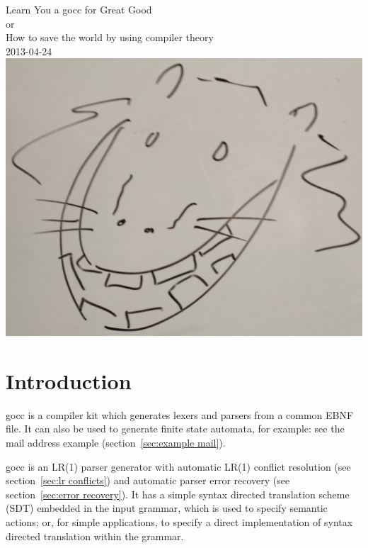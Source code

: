 \documentclass[12pt]{article}
\begin{document}
\begin{center}
	{\Huge Learn You a gocc for Great Good} \\
	{\large or \\
	How to save the world by using compiler theory \\
	\vspace{1cm}
	2013-04-24}\\
	\vspace{1cm}
	\includegraphics[scale=.1]{gocc}
\end{center}
\tableofcontents

\newcommand{\TBD}{\textcolor{red}{TBD}}
\newcommand{\TBDx}[1]{\textcolor{red}{TBD:} #1}
\newcommand{\Go}{{\em Go}\ }
\newcommand{\Code}[1]{{\bf #1} } 
\newcommand{\gocc}{{\em gocc}\ }
\newcommand{\Clang}{{\em C} language}

\section{Introduction}
	gocc is a compiler kit which generates lexers and parsers from a common EBNF file. It can also be used to generate finite state automata, for example: see the mail address example (section~\ref{sec:example mail}).

	gocc is an LR(1) parser generator with automatic LR(1) conflict resolution (see section~\ref{sec:lr conflicts}) and automatic parser error recovery (see section~\ref{sec:error recovery}). It has a simple syntax directed translation scheme (SDT) embedded in the input grammar, which is used to specify semantic actions; or, for simple applications, to specify a direct implementation of syntax directed translation within the grammar.
\end{document}
